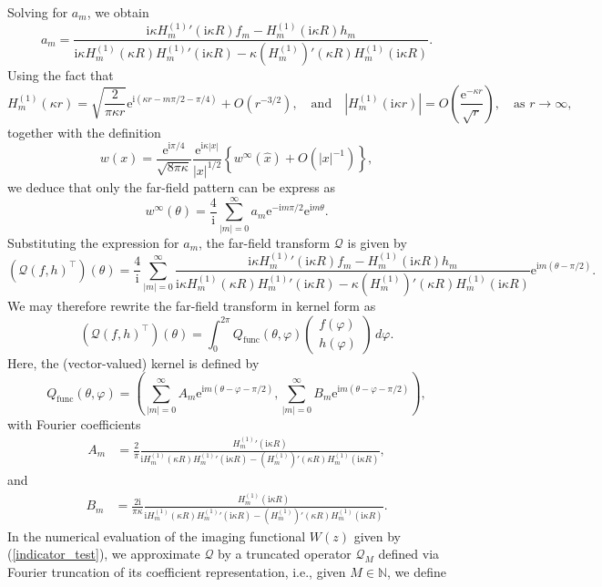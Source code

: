 \documentclass{article}
\begin{document}
Solving for $a_m$, we obtain
\[
a_m=
\frac{
\mathrm i\kappa {H_m^{(1)}}'(\mathrm i\kappa R) f_m
-
H_m^{(1)}(\mathrm i\kappa R) h_m
}{
\mathrm i\kappa H_m^{(1)}(\kappa R){H_m^{(1)}}'(\mathrm i\kappa R)
-
\kappa (H_m^{(1)})'(\kappa R)H_m^{(1)}(\mathrm i\kappa R)
}.
\]
Using the fact that 
\[
H_m^{(1)}(\kappa r)
=
\sqrt{\frac{2}{\pi \kappa r}}
\mathrm e^{\mathrm i(\kappa r - m\pi/2 - \pi/4)}
+O(r^{-3/2}),
\quad \text{and} \quad |H_m^{(1)}(\text{i}\kappa r)|
=O\left(\frac{ \text{e}^{- \kappa r } }{\sqrt{r}}\right),
 \quad \text{as} \, \, r\to\infty,
\]
together with the definition
\[
w(x)=\frac{\mathrm e^{\mathrm i\pi/4}}{\sqrt{8\pi \kappa}}
\frac{\mathrm e^{\mathrm i\kappa |x|}}{|x|^{1/2}}
\left\{
w^\infty(\hat x)+O(|x|^{-1})
\right\},
\]
we deduce that only the far-field pattern can be express as 
\[
w^\infty(\theta)
=
\frac{4}{\mathrm i}
\sum_{|m|=0}^\infty
a_m \mathrm e^{-\mathrm im\pi/2} \mathrm e^{\mathrm im\theta}.
\]
Substituting the expression for $a_m$, the far-field transform $\mathcal Q$ is given by
\[
(\mathcal Q (f,h)^\top)(\theta)
=
\frac{4}{\mathrm i}
\sum_{|m|=0}^\infty
\frac{
\mathrm i\kappa {H_m^{(1)}}'(\mathrm i\kappa R) f_m
-
H_m^{(1)}(\mathrm i\kappa R) h_m
}{
\mathrm i\kappa H_m^{(1)}(\kappa R){H_m^{(1)}}'(\mathrm i\kappa R)
-
\kappa (H_m^{(1)})'(\kappa R)H_m^{(1)}(\mathrm i\kappa R)
}
\mathrm e^{\mathrm im(\theta-\pi/2)}.
\]
We may therefore rewrite the far-field transform in kernel form as
\[
(\mathcal Q(f,h)^\top)(\theta)
=
\int_{0}^{2\pi}
Q_{\mathrm{func}}(\theta,\varphi)
\begin{pmatrix}
f(\varphi)\\
h(\varphi)
\end{pmatrix}
\,d\varphi.
\]
Here, the (vector-valued) kernel is defined by
\[
Q_{\mathrm{func}}(\theta,\varphi)
=
\left(\sum_{|m|=0}^\infty A_m \mathrm e^{\mathrm im(\theta-\varphi-\pi/2)},\sum_{|m|=0}^\infty B_m \mathrm e^{\mathrm im(\theta-\varphi-\pi/2)}\right),
\]
with Fourier coefficients
\begin{align}\label{first_coeff}
A_m &=
\frac{2}{\pi}
\frac{{H_m^{(1)}}'(\mathrm i\kappa R)}
{\mathrm i H_m^{(1)}(\kappa R){H_m^{(1)}}'(\mathrm i\kappa R)
-(H_m^{(1)})'(\kappa R)H_m^{(1)}(\mathrm i\kappa R)},
\end{align}
and
\begin{align}\label{second_coeff}
B_m &=
\frac{2\mathrm i}{\pi\kappa}
\frac{H_m^{(1)}(\mathrm i\kappa R)}
{\mathrm i H_m^{(1)}(\kappa R){H_m^{(1)}}'(\mathrm i\kappa R)
-(H_m^{(1)})'(\kappa R)H_m^{(1)}(\mathrm i\kappa R)}.
\end{align}
In the numerical evaluation of the imaging functional $W(z)$ given by (\ref{indicator_test}), we approximate $\mathcal Q$ by a truncated operator $\mathcal Q_M$ defined via Fourier truncation of its coefficient representation, i.e., given $M\in\mathbb N$, we define
\end{document}
